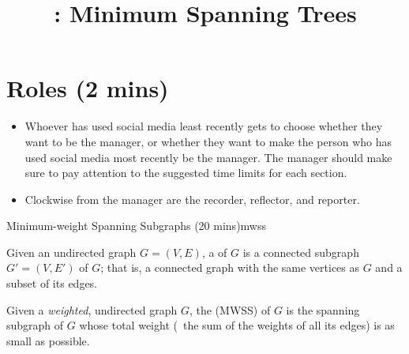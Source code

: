 \documentclass{tufte-handout}
\title{\thecourse: Minimum Spanning Trees}
\date{}
\begin{document}
\maketitle

\section{Roles (2 mins)}

\begin{itemize}
\item Whoever has used social media least recently gets to choose whether
  they want to be the manager, or whether they want to make the person
  who has used social media most recently be the manager.  The manager
  should make sure to pay attention to the suggested time limits for
  each section.
\item Clockwise from the manager are the recorder, reflector, and reporter.
\end{itemize}

\begin{model*}{Minimum-weight Spanning Subgraphs (20 mins)}{mwss}
  \begin{defn}
    Given an undirected graph $G = (V,E)$, a  of $G$ is a connected subgraph $G' = (V,E')$ of $G$;
    that is, a connected graph with the same vertices as $G$ and a
    subset of its edges.
  \end{defn}

  \begin{defn}
    Given a \emph{weighted}, undirected graph $G$, the
     (MWSS) of $G$ is the
    spanning subgraph of $G$ whose total weight (\ie\ the sum of the
    weights of all its edges) is as small as possible.
  \end{defn}

  \begin{center}
    
  \end{center}
\end{model*}
\end{document}
